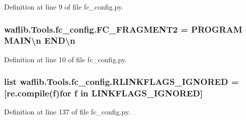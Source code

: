 Definition at line 9 of file fc\+\_\+config.\+py.

\subsubsection[{\texorpdfstring{F\+C\+\_\+\+F\+R\+A\+G\+M\+E\+N\+T2}{FC_FRAGMENT2}}]{ waflib.\+Tools.\+fc\+\_\+config.\+F\+C\+\_\+\+F\+R\+A\+G\+M\+E\+N\+T2 = \textquotesingle{} {\bf P\+R\+O\+G\+R\+AM} M\+A\+I\+N\textbackslash{}n E\+N\+D\textbackslash{}n\textquotesingle{}}\hypertarget{namespacewaflib_1_1_tools_1_1fc__config_a9a207b376ede30c0f7420c542877a9f9}{}\label{namespacewaflib_1_1_tools_1_1fc__config_a9a207b376ede30c0f7420c542877a9f9}


Definition at line 10 of file fc\+\_\+config.\+py.

\subsubsection[{\texorpdfstring{R\+L\+I\+N\+K\+F\+L\+A\+G\+S\+\_\+\+I\+G\+N\+O\+R\+ED}{RLINKFLAGS_IGNORED}}]{\setlength{\rightskip}{0pt plus 5cm}list waflib.\+Tools.\+fc\+\_\+config.\+R\+L\+I\+N\+K\+F\+L\+A\+G\+S\+\_\+\+I\+G\+N\+O\+R\+ED = \mbox{[}re.\+compile({\bf f}){\bf for} {\bf f} {\bf in} L\+I\+N\+K\+F\+L\+A\+G\+S\+\_\+\+I\+G\+N\+O\+R\+ED\mbox{]}}\hypertarget{namespacewaflib_1_1_tools_1_1fc__config_a87954af4abf495d5017cf03be251343e}{}\label{namespacewaflib_1_1_tools_1_1fc__config_a87954af4abf495d5017cf03be251343e}


Definition at line 137 of file fc\+\_\+config.\+py.

